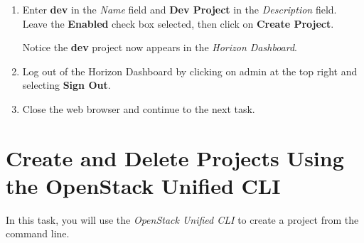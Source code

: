 \documentclass[letterpaper, 12pt]{article}
\begin{document}
\begin{enumerate}
    \item Enter \textbf{dev} in the \textit{Name} field and \textbf{Dev Project} in the \textit{Description} field.
    Leave the \textbf{Enabled} check box selected, then click on \textbf{Create Project}.

    \begin{notebox}{}
        Notice the \textbf{dev} project now appears in the \textit{Horizon Dashboard}.
    \end{notebox}

    \item Log out of the Horizon Dashboard by clicking on admin at the top right and selecting \textbf{Sign Out}.
    
    \item Close the web browser and continue to the next task.
\end{enumerate}

\section{Create and Delete Projects Using the OpenStack Unified CLI}
\label{sec:create_and_delete_projects_using_the_openstack_unified_cli}
In this task, you will use the \textit{OpenStack Unified CLI} to create a project from the command line.
\end{document}
